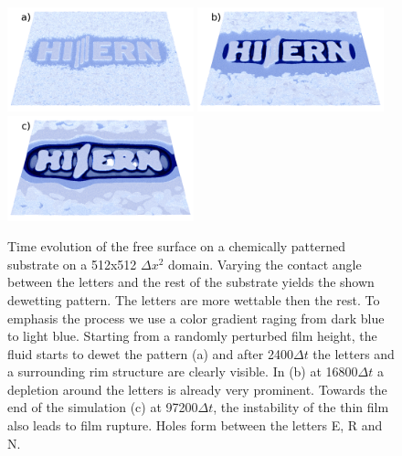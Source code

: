 \begin{figure}
    \centering
    \includegraphics[width=0.48\textwidth]{graphics/Fig_8_1_logo_v2_a).png}
    \includegraphics[width=0.48\textwidth]{graphics/Fig_8_2_logo_v2_b).png}
    \includegraphics[width=0.48\textwidth]{graphics/Fig_8_3_logo_v2_c).png}
  \caption{Time evolution of the free surface on a chemically patterned substrate on a 512x512 $\Delta x^2$ domain. Varying the contact angle between the letters and the rest of the substrate yields the shown dewetting pattern. The letters are more wettable then the rest. To emphasis the process we use a color gradient raging from dark blue to light blue.
  Starting from a randomly perturbed film height, the fluid starts to dewet the pattern (a) and after 2400$\Delta t$ the letters and a surrounding rim structure are clearly visible. In (b) at 16800$\Delta t$ a depletion around the letters is already very prominent. Towards the end of the simulation (c) at 97200$\Delta t$, the instability of the thin film also leads to film rupture. Holes form between the letters E, R and N.  
  }
  \label{fig:Logo_evolution}
\end{figure}

